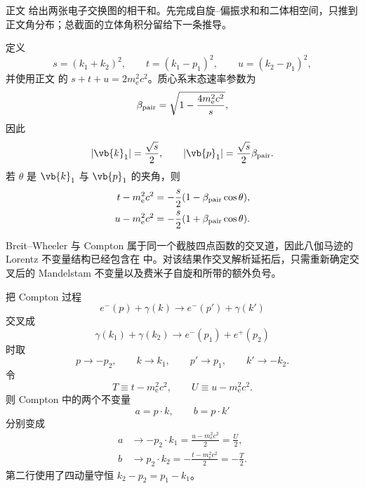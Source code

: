\begin{derivation}[双光子产生电子对的角分布]
正文 给出两张电子交换图的相干和。先完成自旋--偏振求和和二体相空间，只推到正文角分布；总截面的立体角积分留给下一条推导。

定义
\begin{equation*}
 s=(k_1+k_2)^2,\qquad
 t=(k_1-p_1)^2,\qquad
 u=(k_2-p_1)^2,
\end{equation*}
并使用正文 的 $s+t+u=2m_{\mathrm e}^2c^2$。质心系末态速率参数为
\begin{equation*}
 \beta_{\rm pair}=\sqrt{1-\frac{4m_{\mathrm e}^2c^2}{s}},
\end{equation*}
因此
\begin{equation*}
 |\vb{k}_1|=\frac{\sqrt s}{2},\qquad
 |\vb{p}_1|=\frac{\sqrt s}{2}\beta_{\rm pair}.
\end{equation*}
若 $\theta$ 是 $\vb{k}_1$ 与 $\vb{p}_1$ 的夹角，则
\begin{align*}
 t-m_{\mathrm e}^2c^2&=-\frac{s}{2}(1-\beta_{\rm pair}\cos\theta),\\
 u-m_{\mathrm e}^2c^2&=-\frac{s}{2}(1+\beta_{\rm pair}\cos\theta).
\end{align*}

Breit--Wheeler 与 Compton 属于同一个截肢四点函数的交叉道，因此八伽马迹的 Lorentz 不变量结构已经包含在 中。对该结果作交叉解析延拓后，只需重新确定交叉后的 Mandelstam 不变量以及费米子自旋和所带的额外负号。

把 Compton 过程
\begin{equation*}
 e^-(p)+\gamma(k)\to e^-(p')+\gamma(k')
\end{equation*}
交叉成
\begin{equation*}
 \gamma(k_1)+\gamma(k_2)\to e^-(p_1)+e^+(p_2)
\end{equation*}
时取
\begin{equation*}
 p\to-p_2,
 \qquad
 k\to k_1,
 \qquad
 p'\to p_1,
 \qquad
 k'\to-k_2.
\end{equation*}
令
\begin{equation*}
 T\equiv t-m_{\mathrm e}^2c^2,
 \qquad
 U\equiv u-m_{\mathrm e}^2c^2.
\end{equation*}
则 Compton 中的两个不变量
\begin{equation*}
 a=p\cdot k,
 \qquad
 b=p\cdot k'
\end{equation*}
分别变成
\begin{align*}
 a&\to-p_2\cdot k_1
 =\frac{u-m_{\mathrm e}^2c^2}{2}=\frac U2,\\
 b&\to p_2\cdot k_2
 =-\frac{t-m_{\mathrm e}^2c^2}{2}=-\frac T2.
\end{align*}
第二行使用了四动量守恒 $k_2-p_2=p_1-k_1$。


\end{derivation}
